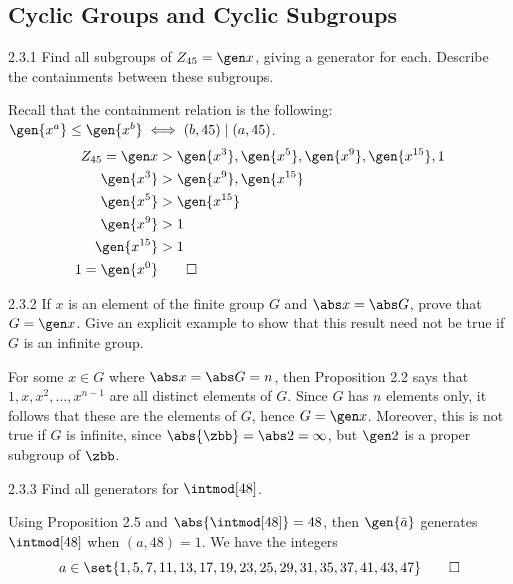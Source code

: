\subsection{Cyclic Groups and Cyclic Subgroups}

\begin{exercise}{2.3.1}
    Find all subgroups of $Z_{45} = \gen x$, giving a generator for each.
	Describe the containments between these subgroups.
\end{exercise}

\begin{sol}
    Recall that the containment relation is the following: $\gen{x^a} \leq \gen{x^b} \iff (b, 45) \mid (a, 45)$.
    \begin{align*}
        Z_{45} = \gen x & > \gen{x^3}, \gen{x^5}, \gen {x^9}, \gen{x^{15}}, 1 \\
        \gen{x^3} & > \gen{x^9}, \gen{x^{15}} \\
        \gen{x^5} & > \gen{x^{15}} \\
        \gen{x^9} & > 1 \\
        \gen{x^{15}} & > 1 \\
        1 = \gen{x^0} & \qedhere
    \end{align*}
\end{sol}

\begin{exercise}{2.3.2}
    If $x$ is an element of the finite group $G$ and $\abs x = \abs G$, prove that $G = \gen x$.
	Give an explicit example to show that this result need not be true if $G$ is an infinite group.
\end{exercise}

\begin{sol}
    For some $x \in G$ where $\abs x = \abs G = n$, then Proposition 2.2 says that $1, x, x^2, \ldots, x^{n - 1}$ are all distinct elements of $G$.
	Since $G$ has $n$ elements only, it follows that these are the elements of $G$, hence $G = \gen x$.
	Moreover, this is not true if $G$ is infinite, since $\abs{\zbb} = \abs 2 = \infty$, but $\gen 2$ is a proper subgroup of $\zbb$.
\end{sol}

\begin{exercise}{2.3.3}
    Find all generators for $\intmod[48]$.
\end{exercise}

\begin{sol}
    Using Proposition 2.5 and $\abs{\intmod[48]} = 48$, then $\gen{\bar a}$ generates $\intmod[48]$ when $(a, 48) = 1$.
	We have the integers
    \[
    	a \in \set{1, 5, 7, 11, 13, 17, 19, 23, 25, 29, 31, 35, 37, 41, 43, 47} \qedhere
    \]
\end{sol}


